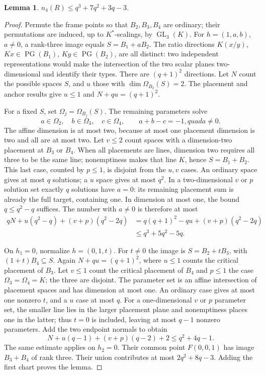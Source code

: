 \documentclass[12pt,letterpaper,onecolumn]{article}
\newtheorem{lemma}[theorem]{Lemma}
\theoremstyle{definition}
\theoremstyle{remark}
\DeclareMathOperator{\GL}{GL}
\DeclareMathOperator{\PG}{PG}
\begin{document}
\begin{lemma}\label{lem:core-four-existing}
\(n_4(R)\le q^3+7q^2+3q-3\).
\end{lemma}
\begin{proof}
Permute the frame points so that \(B_2,B_3,B_4\) are ordinary; their permutations are induced, up to \(K^*\)-scalings, by \(\GL_3(K)\).
For \(h=(1,a,b)\), \(a\ne0\), a rank-three image equals \(S=B_1+aB_2\).
The ratio directions \(K(x/y)\), \(Kx\in\PG(B_1)\), \(Ky\in\PG(B_2)\), are all distinct: two independent representations would make the intersection of the two scalar planes two-dimensional and identify their types.
There are \((q+1)^2\) directions.
Let \(N\) count the possible spaces \(S\), and \(u\) those with \(\dim\Omega_{B_2}(S)=2\).
The placement and anchor results give \(u\le1\) and
\(N+qu=(q+1)^2\).

For a fixed \(S\), set \(\Omega_j=\Omega_{B_j}(S)\).
The remaining parameters solve
\[
a\in\Omega_2,\quad b\in\Omega_3,\quad c\in\Omega_4,
\qquad a+b-c=-1,quad a\ne0.
\]
The affine dimension is at most two, because at most one placement dimension is two and all are at most two.
Let \(v\le2\) count spaces with a dimension-two placement at \(B_3\) or \(B_4\).
When all placements are lines, dimension two requires all three to be the same line; nonemptiness makes that line \(K\), hence \(S=B_1+B_2\).
This last case, counted by \(p\le1\), is disjoint from the \(u,v\) cases.
An ordinary space gives at most \(q\) solutions; a \(u\) space gives at most \(q^2\).
In a two-dimensional \(v\) or \(p\) solution set exactly \(q\) solutions have \(a=0\): its remaining placement sum is already the full target, containing one. In dimension at most one, the bound \(q\le q^2-q\) suffices.
The number with \(a\ne0\) is therefore at most
\begin{align*}
qN+u(q^2-q)+(v+p)(q^2-2q)
&=q(q+1)^2-qu+(v+p)(q^2-2q)\\
&\le q^3+5q^2-5q.
\end{align*}

On \(h_1=0\), normalize \(h=(0,1,t)\).
For \(t\ne0\) the image is \(S=B_2+tB_3\), with \((1+t)B_4\subseteq S\).
Again \(N+qu=(q+1)^2\), where \(u\le1\) counts the critical placement of \(B_3\).
Let \(v\le1\) count the critical placement of \(B_4\) and \(p\le1\) the case \(\Omega_3=\Omega_4=K\); the three are disjoint.
The parameter set is an affine intersection of placement spaces and has dimension at most one.
An ordinary case gives at most one nonzero \(t\), and a \(u\) case at most \(q\).
For a one-dimensional \(v\) or \(p\) parameter set, the smaller line lies in the larger placement plane and nonemptiness places one in the latter; thus \(t=0\) is included, leaving at most \(q-1\) nonzero parameters.
Add the two endpoint normals to obtain
\[
N+u(q-1)+(v+p)(q-2)+2\le q^2+4q-1.
\]
The same estimate applies on \(h_2=0\).
Their common point \(F(0,0,1)\) has image \(B_3+B_4\) of rank three.
Their union contributes at most \(2q^2+8q-3\).
Adding the first chart proves the lemma.
\end{proof}
\end{document}
